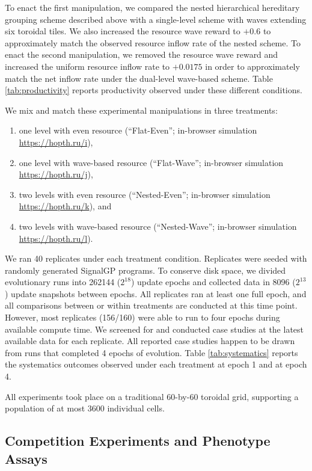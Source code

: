 To enact the first manipulation, we compared the nested hierarchical hereditary grouping scheme described above with a single-level scheme with waves extending six toroidal tiles.
We also increased the resource wave reward to $+0.6$ to approximately match the observed resource inflow rate of the nested scheme.
To enact the second manipulation, we removed the resource wave reward and increased the uniform resource inflow rate to $+0.0175$ in order to approximately match the net inflow rate under the dual-level wave-based scheme.
Table \ref{tab:productivity} reports productivity observed under these different conditions.

We mix and match these experimental manipulations in three treatments:
\begin{enumerate}
\item one level with even resource (``Flat-Even''; in-browser simulation \url{https://hopth.ru/i}),
\item one level with wave-based resource (``Flat-Wave''; in-browser simulation \url{https://hopth.ru/j}),
\item two levels with even resource (``Nested-Even''; in-browser simulation \url{https://hopth.ru/k}), and
\item two levels with wave-based resource (``Nested-Wave''; in-browser simulation \url{https://hopth.ru/l}).
\end{enumerate}

We ran 40 replicates under each treatment condition.
Replicates were seeded with randomly generated SignalGP programs.
To conserve disk space, we divided evolutionary runs into 262144 ($2^{18}$) update epochs and collected data in 8096 ($2^{13}$) update snapshots between epochs.
All replicates ran at least one full epoch, and all comparisons between or within treatments are conducted at this time point.
However, most replicates (156/160) were able to run to four epochs during available compute time.
We screened for and conducted case studies at the latest available data for each replicate.
All reported case studies happen to be drawn from runs that completed 4 epochs of evolution.
Table \ref{tab:systematics} reports the systematics outcomes observed under each treatment at epoch 1 and at epoch 4.

All experiments took place on a traditional 60-by-60 toroidal grid, supporting a population of at most 3600 individual cells.

\subsection{Competition Experiments and Phenotype Assays} \label{sup:competition_assays}

